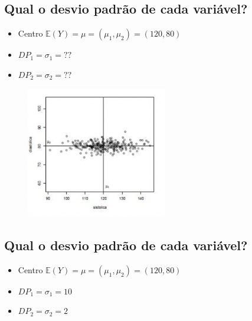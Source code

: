 \documentclass[
  letterpaper,
  DIV=11,
  numbers=noendperiod]{scrartcl}
\providecommand{\tightlist}{%
  \setlength{\itemsep}{0pt}\setlength{\parskip}{0pt}}\usepackage{longtable,booktabs,array}
\begin{document}
\hypertarget{qual-o-desvio-padruxe3o-de-cada-variuxe1vel}{%
\subsection{Qual o desvio padrão de cada
variável?}\label{qual-o-desvio-padruxe3o-de-cada-variuxe1vel}}

\begin{itemize}
\tightlist
\item
  Centro \(\mathbb E(Y) = \mu = (\mu_1, \mu_2) = (120,80)\)
\item
  \(DP_1 = \sigma_1 = ??\)
\item
  \(DP_2 = \sigma_2 = ??\)
\end{itemize}

\begin{figure}

{\centering \includegraphics[width=0.55\textwidth,height=\textheight]{figs/Aula07/pressao2.png}

}

\end{figure}

\hypertarget{qual-o-desvio-padruxe3o-de-cada-variuxe1vel-1}{%
\subsection{Qual o desvio padrão de cada
variável?}\label{qual-o-desvio-padruxe3o-de-cada-variuxe1vel-1}}

\begin{itemize}
\tightlist
\item
  Centro \(\mathbb E(Y) = \mu = (\mu_1, \mu_2) = (120,80)\)
\item
  \(DP_1 = \sigma_1 = 10\)
\item
  \(DP_2 = \sigma_2 = 2\)
\end{itemize}
\end{document}
